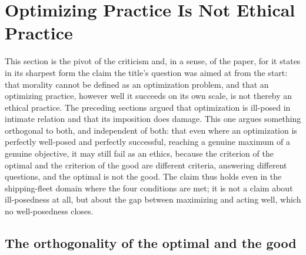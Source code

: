 \section{Optimizing Practice Is Not Ethical Practice}
\label{p25:sec:ethics}

\noindent
This section is the pivot of the criticism and, in a sense, of the paper, for it states in its sharpest form the claim the title's question was aimed at from the start: that morality cannot be defined as an optimization problem, and that an optimizing practice, however well it succeeds on its own scale, is not thereby an ethical practice. The preceding sections argued that optimization is ill-posed in intimate relation and that its imposition does damage. This one argues something orthogonal to both, and independent of both: that even where an optimization is perfectly well-posed and perfectly successful, reaching a genuine maximum of a genuine objective, it may still fail as an ethics, because the criterion of the optimal and the criterion of the good are different criteria, answering different questions, and the optimal is not the good. The claim thus holds even in the shipping-fleet domain where the four conditions are met; it is not a claim about ill-posedness at all, but about the gap between maximizing and acting well, which no well-posedness closes.

\subsection*{The orthogonality of the optimal and the good}

